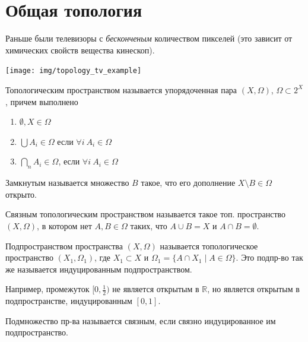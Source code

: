 \section{Общая топология}
Раньше были телевизоры с \textit{бесконченым} количеством пикселей (это зависит от химических свойств вещества кинескоп).
\begin{center}
    \texttt{[image: img/topology\_tv\_example]}
\end{center}

\begin{definition}
    Топологическим пространством называется упорядоченная пара $(X, \Omega)$, $\Omega \subset 2^X$, причем выполнено 
    \begin{enumerate}
        \item $\emptyset, X \in \Omega$
        \item $\bigcup A_i \in \Omega$ если $\forall i\ A_i \in \Omega$
        \item $\bigcap_{n} A_i \in \Omega$, если $\forall i\ A_i \in \Omega$
    \end{enumerate}
\end{definition}

\begin{definition}
    Замкнутым называется множество $B$ такое, что его дополнение $X \setminus B \in \Omega$ открыто.
    \end{definition}

\begin{definition}
    Связным топологическим пространством называется такое топ. пространство $(X, \Omega)$, в котором нет $A,B \in \Omega$ таких, что $A \cup B = X$ и $A \cap B = \emptyset$.
\end{definition}

\begin{definition}
    Подпространством пространства $(X, \Omega)$ называется топологическое пространство $(X_1, \Omega_1)$, где $X_1 \subset X$ и $\Omega_1 =\{A \cap X_1 \mid A \in \Omega \}$.
    Это подпр-во так же называется индуцированным подпространством.
\end{definition}

Например, промежуток $[0, \frac{1}{2})$ не является открытым в $\mathbb{R}$, но является открытым в подпространстве, индуцированным $[0, 1]$.

\begin{definition}
    Подмножество пр-ва называется связным, если связно индуцированное им подпространство.
\end{definition}

